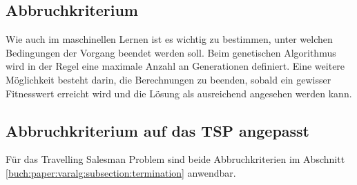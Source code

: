 %
%
%
%
\subsection{Abbruchkriterium
\label{buch:paper:varalg:subsection:termination}}
Wie auch im maschinellen Lernen ist es wichtig zu bestimmen, unter 
welchen Bedingungen der Vorgang beendet werden soll. Beim 
genetischen Algorithmus wird in der Regel eine maximale Anzahl an 
Generationen definiert. Eine weitere Möglichkeit besteht darin, 
die Berechnungen zu beenden, sobald ein gewisser Fitnesswert erreicht 
wird und die Lösung als ausreichend angesehen werden kann.

\subsection{Abbruchkriterium auf das TSP angepasst
\label{buch:paper:varalg:subsection:termination_tsp}}
Für das Travelling Salesman Problem sind beide Abbruchkriterien im 
Abschnitt \ref{buch:paper:varalg:subsection:termination} anwendbar.
